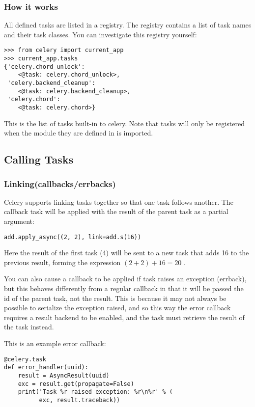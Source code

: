 \documentclass[9pt,a4paper]{article}
\begin{document}
\begin{CJK*}{GBK}{kai}
\subsubsection{How it works}
All defined tasks are listed in a registry. The registry contains a list of task names and their task classes. You can investigate this registry yourself:

\begin{Verbatim}[frame=single]
>>> from celery import current_app
>>> current_app.tasks
{'celery.chord_unlock':
    <@task: celery.chord_unlock>,
 'celery.backend_cleanup':
    <@task: celery.backend_cleanup>,
 'celery.chord':
    <@task: celery.chord>}
\end{Verbatim}

This is the list of tasks built-in to celery. Note that tasks will only be registered when the module they are defined in is imported.

\subsection{Calling Tasks}

\subsubsection{Linking(callbacks/errbacks)}
Celery supports linking tasks together so that one task follows another. The callback task will be applied with the result of the parent task as a partial argument:

\begin{Verbatim}[frame=single]
add.apply_async((2, 2), link=add.s(16))
\end{Verbatim}

Here the result of the first task (4) will be sent to a new task that adds 16 to the previous result, forming the expression $(2 + 2) + 16 = 20$ .

You can also cause a callback to be applied if task raises an exception (errback), but this behaves differently from a regular callback in that it will be passed the id of the parent task, not the result. This is because it may not always be possible to serialize the exception raised, and so this way the error callback requires a result backend to be enabled, and the task must retrieve the result of the task instead.

This is an example error callback:

\begin{Verbatim}[frame=single]
@celery.task
def error_handler(uuid):
    result = AsyncResult(uuid)
    exc = result.get(propagate=False)
    print('Task %r raised exception: %r\n%r' % (
          exc, result.traceback))
\end{Verbatim}


\end{CJK*}
\end{document}
